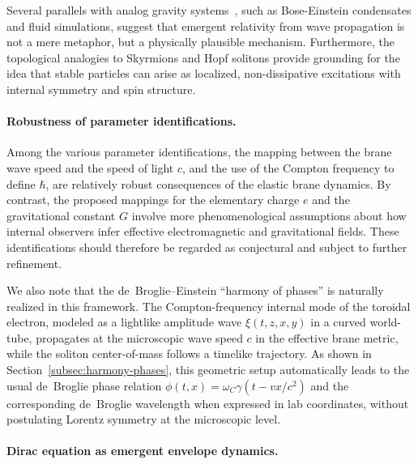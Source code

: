 Several parallels with analog gravity systems~\cite{Barcelo2011AnalogueGravity,Volovik2003HeliumDroplet}, such as Bose-Einstein
condensates and fluid simulations, suggest that emergent relativity from
wave propagation is not a mere metaphor, but a physically plausible
mechanism. Furthermore, the topological analogies to Skyrmions and Hopf
solitons provide grounding for the idea that stable particles can arise
as localized, non-dissipative excitations with internal symmetry and
spin structure.

\paragraph{Robustness of parameter identifications.}
Among the various parameter identifications, the mapping between the brane wave speed and the speed of light $c$, and the use of the Compton frequency to define $\hbar$, are relatively robust consequences of the elastic brane dynamics. By contrast, the proposed mappings for the elementary charge $e$ and the gravitational constant $G$ involve more phenomenological assumptions about how internal observers infer effective electromagnetic and gravitational fields. These identifications should therefore be regarded as conjectural and subject to further refinement.

We also note that the de~Broglie--Einstein ``harmony of phases'' is
naturally realized in this framework. The Compton-frequency internal
mode of the toroidal electron, modeled as a lightlike amplitude wave
$\xi(t,z,x,y)$ in a curved world-tube, propagates at the microscopic
wave speed $c$ in the effective brane metric, while the soliton
center-of-mass follows a timelike trajectory. As shown in
Section~\ref{subsec:harmony-phases}, this geometric setup
automatically leads to the usual de~Broglie phase relation
$\phi(t,x) = \omega_C \gamma (t - v x/c^2)$ and the corresponding
de~Broglie wavelength when expressed in lab coordinates, without
postulating Lorentz symmetry at the microscopic level.

\paragraph{Dirac equation as emergent envelope dynamics.}

